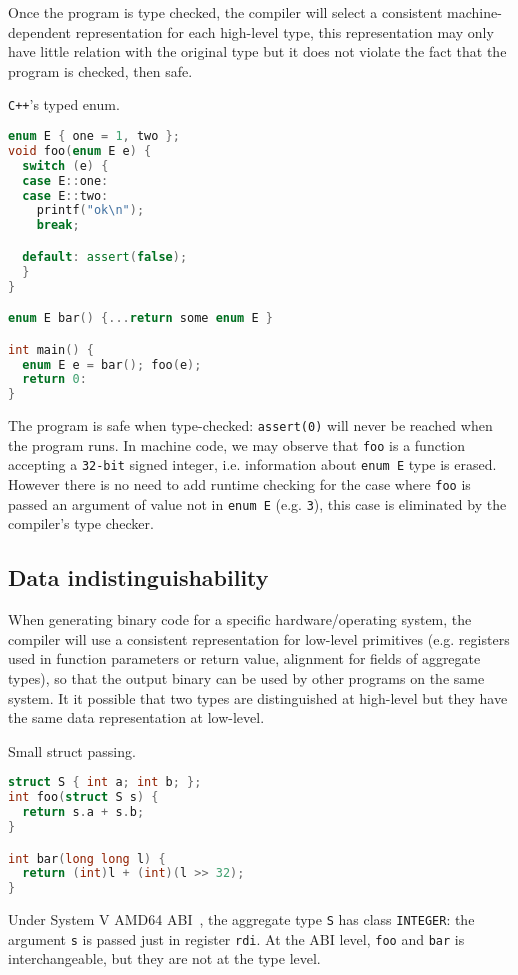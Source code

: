 \documentclass[a4paper]{llncs}
\begin{document}
Once the program is type checked,
 the compiler will select a consistent machine-dependent
representation for each high-level type, this representation may only have little
relation with the original type but it does not violate the fact that the program
is checked, then safe.

\begin{example}\label{exa:typed_enum}
\texttt{C++}'s typed enum.

\begin{lstlisting}[frame=lines, language={C++}]
enum E { one = 1, two };
void foo(enum E e) {
  switch (e) {
  case E::one:
  case E::two:
    printf("ok\n");
    break;

  default: assert(false);
  }
}

enum E bar() {...return some enum E }

int main() {
  enum E e = bar(); foo(e);
  return 0:
}
\end{lstlisting}

The program is safe when type-checked: \texttt{assert(0)} will
never be reached when the program runs. In machine code, we may observe that
\texttt{foo} is a function accepting a \texttt{32-bit} signed integer, i.e. information about
\texttt{enum E} type is erased. However there is no need to add runtime
checking for the case where \texttt{foo} is passed an argument of value not in \texttt{enum E}
(e.g. \texttt{3}), this case is eliminated by the compiler's type checker.
\end{example}

\subsection{Data indistinguishability}
When generating binary code for a specific hardware/operating system, the compiler will
use a consistent representation for low-level primitives (e.g. registers used in
function parameters or return value, alignment for fields of aggregate types), so that
the output binary can be used by other programs on the same system. It it possible that
two types are distinguished at high-level but they have the same data representation
at low-level.

\begin{example}\label{exa:register_struct}
Small struct passing.

\begin{lstlisting}[frame=lines, language={C}]
struct S { int a; int b; };
int foo(struct S s) {
  return s.a + s.b;
}

int bar(long long l) {
  return (int)l + (int)(l >> 32);
}
\end{lstlisting}

Under System V AMD64 ABI~\cite{lu_system_nodate}, the aggregate type \texttt{S}
has class \texttt{INTEGER}: the argument \texttt{s} is passed just in register \texttt{rdi}.
At the ABI level, \texttt{foo} and \texttt{bar} is interchangeable, but they are not at
the type level.
\end{example}
\end{document}
